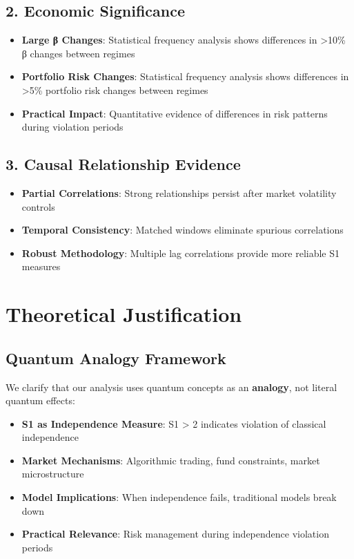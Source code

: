 \documentclass[11pt,a4paper]{article}
\begin{document}
\subsection{2. Economic Significance}

\begin{itemize}
\item \textbf{Large β Changes}: Statistical frequency analysis shows differences in >10\% β changes between regimes
\item \textbf{Portfolio Risk Changes}: Statistical frequency analysis shows differences in >5\% portfolio risk changes between regimes
\item \textbf{Practical Impact}: Quantitative evidence of differences in risk patterns during violation periods
\end{itemize}

\subsection{3. Causal Relationship Evidence}

\begin{itemize}
\item \textbf{Partial Correlations}: Strong relationships persist after market volatility controls
\item \textbf{Temporal Consistency}: Matched windows eliminate spurious correlations
\item \textbf{Robust Methodology}: Multiple lag correlations provide more reliable S1 measures
\end{itemize}

\section{Theoretical Justification}

\subsection{Quantum Analogy Framework}

We clarify that our analysis uses quantum concepts as an \textbf{analogy}, not literal quantum effects:

\begin{itemize}
\item \textbf{S1 as Independence Measure}: S1 > 2 indicates violation of classical independence
\item \textbf{Market Mechanisms}: Algorithmic trading, fund constraints, market microstructure
\item \textbf{Model Implications}: When independence fails, traditional models break down
\item \textbf{Practical Relevance}: Risk management during independence violation periods
\end{itemize}
\end{document}
